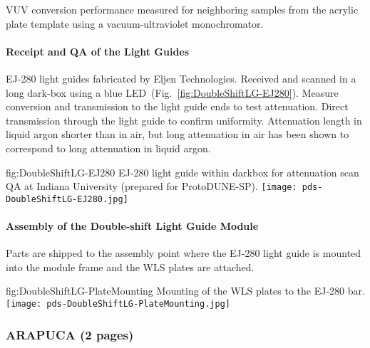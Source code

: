VUV conversion performance measured for neighboring samples from the 
acrylic plate template using a vacuum-ultraviolet monochromator.

\paragraph*{Receipt and QA of the Light Guides}

EJ-280 light guides fabricated by Eljen Technologies. Received and scanned in a 
long dark-box using a blue LED~(Fig.~\ref{fig:DoubleShiftLG-EJ280}).
 Measure conversion and transmission to the light guide ends to test attenuation. 
Direct transmission through the light guide to confirm uniformity. 
Attenuation length in liquid argon shorter than in air, but long attenuation in 
air has been shown to correspond to long attenuation in liquid argon.

\begin{dunefigure}{fig:DoubleShiftLG-EJ280}
{EJ-280 light guide within darkbox for attenuation scan QA at Indiana University (prepared for ProtoDUNE-SP).}
  \texttt{[image: pds-DoubleShiftLG-EJ280.jpg]}
\end{dunefigure}

\paragraph*{Assembly of the Double-shift Light Guide Module}

Parts are shipped to the assembly point where the EJ-280 light guide is mounted 
into the module frame and the WLS plates are attached.

\begin{dunefigure}{fig:DoubleShiftLG-PlateMounting}
{Mounting of the WLS plates to the EJ-280 bar.}
  \texttt{[image: pds-DoubleShiftLG-PlateMounting.jpg]}
\end{dunefigure}


\subsubsection{ARAPUCA (2 pages)}
\label{ssec:fdsp-pd-pc-prod-arapuca}



